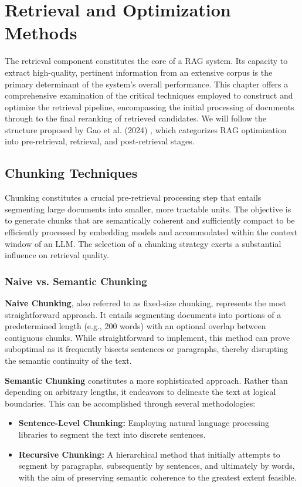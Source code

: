 \chapter{Retrieval and Optimization Methods}
\label{chap:retrieval_optimization}

The retrieval component constitutes the core of a RAG system. Its capacity to extract high-quality, pertinent information from an extensive corpus is the primary determinant of the system's overall performance. This chapter offers a comprehensive examination of the critical techniques employed to construct and optimize the retrieval pipeline, encompassing the initial processing of documents through to the final reranking of retrieved candidates. We will follow the structure proposed by Gao et al. (2024) \autocite{gao2024retrievalaugmented}, which categorizes RAG optimization into pre-retrieval, retrieval, and post-retrieval stages.

\section{Chunking Techniques}
Chunking constitutes a crucial pre-retrieval processing step that entails segmenting large documents into smaller, more tractable units. The objective is to generate chunks that are semantically coherent and sufficiently compact to be efficiently processed by embedding models and accommodated within the context window of an LLM. The selection of a chunking strategy exerts a substantial influence on retrieval quality.

\subsection{Naive vs. Semantic Chunking}
\textbf{Naive Chunking}, also referred to as fixed-size chunking, represents the most straightforward approach. It entails segmenting documents into portions of a predetermined length (e.g., 200 words) with an optional overlap between contiguous chunks. While straightforward to implement, this method can prove suboptimal as it frequently bisects sentences or paragraphs, thereby disrupting the semantic continuity of the text.

\textbf{Semantic Chunking} constitutes a more sophisticated approach. Rather than depending on arbitrary lengths, it endeavors to delineate the text at logical boundaries. This can be accomplished through several methodologies:
\begin{itemize}
    \item \textbf{Sentence-Level Chunking:} Employing natural language processing libraries to segment the text into discrete sentences.
    \item \textbf{Recursive Chunking:} A hierarchical method that initially attempts to segment by paragraphs, subsequently by sentences, and ultimately by words, with the aim of preserving semantic coherence to the greatest extent feasible.
\end{itemize}

